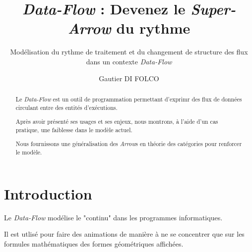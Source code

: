 \documentclass{llncs}
\newcommand{\DF}{\emph{Data-Flow} }
\newcommand{\SA}{\emph{Super-Arrow} }
\newcommand{\Arrs}{\emph{Arrow}s }
\begin{document}
\title{\DF : Devenez le \SA du rythme}


\subtitle{Modélisation du rythme de traitement et du changement de structure des flux dans un contexte \DF}


\author{Gautier DI FOLCO}







\maketitle

\begin{abstract}
Le \DF est un outil de programmation permettant d'exprimr des flux de
données circulant entre des entités d'exécutions.

Après avoir présenté ses usages et ses enjeux, nous montrons, à l'aide d'un
cas pratique, une faiblesse dans le modèle actuel.

Nous fournissons une généralisation des \Arrs en théorie des catégories pour
renforcer le modèle.
\end{abstract}

\section{Introduction}
Le \DF modélise le "continu" dans les programmes informatiques.

Il est utlisé pour faire des animations de manière à ne se
concentrer que sur les formules mathématiques des formes géométriques affichées.
\end{document}
